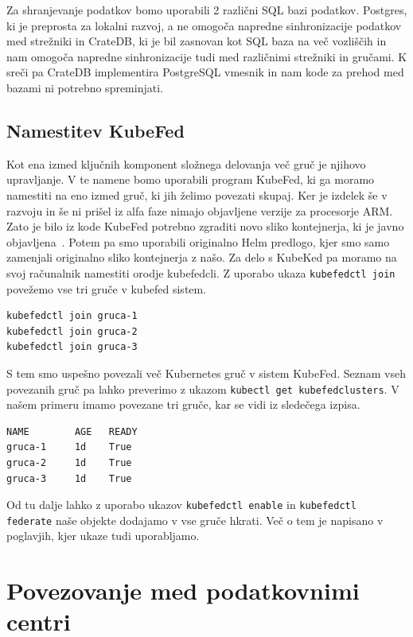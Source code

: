 \documentclass[a4paper, 12pt]{book}
\begin{document}
Za shranjevanje podatkov bomo uporabili 2 različni SQL bazi podatkov.
Postgres, ki je preprosta za lokalni razvoj, a ne omogoča napredne sinhronizacije podatkov med strežniki in CrateDB, ki je bil zasnovan kot SQL baza na več vozliščih in nam omogoča napredne sinhronizacije tudi med različnimi strežniki in gručami.
K sreči pa CrateDB implementira PostgreSQL vmesnik in nam kode za prehod med bazami ni potrebno spreminjati.
\section{Namestitev KubeFed}
Kot ena izmed ključnih komponent složnega delovanja več gruč je njihovo upravljanje.
V te namene bomo uporabili program KubeFed, ki ga moramo namestiti na eno izmed gruč, ki jih želimo povezati skupaj.
Ker je izdelek še v razvoju in še ni prišel iz alfa faze nimajo objavljene verzije za procesorje ARM.
Zato je bilo iz kode KubeFed potrebno zgraditi novo sliko kontejnerja, ki je javno objavljena~\cite{docker-kubefed}.
Potem pa smo uporabili originalno Helm predlogo, kjer smo samo zamenjali originalno sliko kontejnerja z našo.
Za delo s KubeKed pa moramo na svoj računalnik namestiti orodje kubefedcli.
Z uporabo ukaza \verb|kubefedctl join| povežemo vse tri gruče v kubefed sistem.
\begin{verbatim}
kubefedctl join gruca-1
kubefedctl join gruca-2
kubefedctl join gruca-3
\end{verbatim}
S tem smo uspešno povezali več Kubernetes gruč v sistem KubeFed.
Seznam vseh povezanih gruč pa lahko preverimo z ukazom \verb|kubectl get kubefedclusters|. 
V našem primeru imamo povezane tri gruče, kar se vidi iz sledečega izpisa.
\begin{verbatim}
NAME        AGE   READY
gruca-1     1d    True
gruca-2     1d    True
gruca-3     1d    True
\end{verbatim}
Od tu dalje lahko z uporabo ukazov \verb|kubefedctl enable| in \verb|kubefedctl federate| naše objekte dodajamo v vse gruče hkrati.
Več o tem je napisano v poglavjih, kjer ukaze tudi uporabljamo.

\chapter{Povezovanje med podatkovnimi centri}
\label{povezovanje-med-centri}
\end{document}
